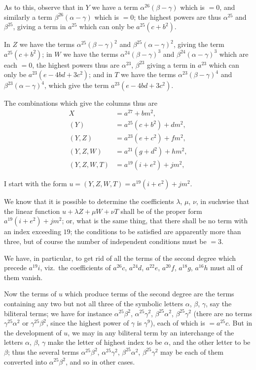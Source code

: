 \documentclass[11pt,a4paper]{book}
\begin{document}
As to this, observe that in $Y$ we have a term $\alpha^{26}(\beta - \gamma)$ which is $= 0$, and similarly a term $\beta^{26}(\alpha - \gamma)$ which is $= 0$; the highest powers are thus $\alpha^{25}$ and $\beta^{25}$, giving a term in $a^{25}$ which can only be $a^{25}(c + b^2)$.

In $Z$ we have the terms $\alpha^{25}(\beta - \gamma)^2$ and $\beta^{25}(\alpha - \gamma)^2$, giving the term $a^{25}(c + b^2)$; in $W$ we have the terms $\alpha^{24}(\beta - \gamma)^3$ and $\beta^{24}(\alpha - \gamma)^3$ which are each $= 0$, the highest powers thus are $\alpha^{23}$, $\beta^{23}$ giving a term in $a^{23}$ which can only be $a^{23}(e - 4bd + 3c^2)$; and in $T$ we have the terms $\alpha^{23}(\beta - \gamma)^4$ and $\beta^{23}(\alpha - \gamma)^4$, which give the term $a^{23}(e - 4bd + 3c^2)$.

The combinations which give the columns thus are
\begin{align*}
X &= a^{27} + bm^2,\\
(Y) &= a^{25}(c + b^2) + dm^2,\\
(Y, Z) &= a^{23}(e + c^2) + fm^2,\\
(Y, Z, W) &= a^{21}(g + d^2) + hm^2,\\
(Y, Z, W, T) &= a^{19}(i + e^2) + jm^2,
\end{align*}

I start with the form $u = (Y, Z, W, T) = a^{19}(i + e^2) + jm^2$.

We know that it is possible to determine the coefficients $\lambda$, $\mu$, $\nu$, in suchwise that the linear function $u + \lambda Z + \mu W + \nu T$ shall be of the proper form $a^{19}(i + e^2) + jm^2$; or, what is the same thing, that there shall be no term with an index exceeding $19$; the conditions to be satisfied are apparently more than three, but of course the number of independent conditions must be $= 3$.

We have, in particular, to get rid of all the terms of the second degree which precede $a^{19}i$, viz.\ the coefficients of $a^{26}c$, $a^{24}d$, $a^{22}e$, $a^{20}f$, $a^{18}g$, $a^{16}h$ must all of them vanish.

Now the terms of $u$ which produce terms of the second degree are the terms containing any two but not all three of the symbolic letters $\alpha$, $\beta$, $\gamma$, say the biliteral terms; we have for instance $\alpha^{25}\beta^2$, $\alpha^{25}\gamma^2$, $\beta^{25}\alpha^2$, $\beta^{25}\gamma^2$ (there are no terms $\gamma^{25}\alpha^2$ or $\gamma^{25}\beta^2$, since the highest power of $\gamma$ is $\gamma^9$), each of which is $= a^{25}c$. But in the development of $u$, we may in any biliteral term by an interchange of the letters $\alpha$, $\beta$, $\gamma$ make the letter of highest index to be $\alpha$, and the other letter to be $\beta$; thus the several terms $\alpha^{25}\beta^2$, $\alpha^{25}\gamma^2$, $\beta^{25}\alpha^2$, $\beta^{25}\gamma^2$ may be each of them converted into $\alpha^{25}\beta^2$, and so in other cases.
\end{document}
